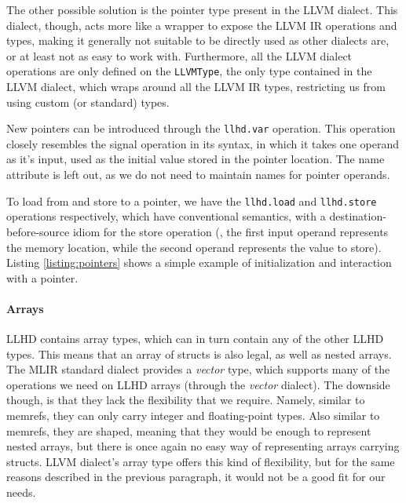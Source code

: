 The other possible solution is the pointer type present in the LLVM dialect. This dialect, though, acts more like a wrapper to expose the LLVM IR operations and types, making it generally not suitable to be directly used as other dialects are, or at least not as easy to work with. Furthermore, all the LLVM dialect operations are only defined on the \texttt{LLVMType}, the only type contained in the LLVM dialect, which wraps around all the LLVM IR types, restricting us from using custom (or standard) types.

New pointers can be introduced through the \texttt{llhd.var} operation. This operation closely resembles the signal operation in its syntax, in which it takes one operand as it's input, used as the initial value stored in the pointer location. The name attribute is left out, as we do not need to maintain names for pointer operands.

To load from and store to a pointer, we have the \texttt{llhd.load} and \texttt{llhd.store} operations respectively, which have conventional semantics, with a destination-before-source idiom for the store operation (\ie, the first input operand represents the memory location, while the second operand represents the value to store). Listing \ref{listing:pointers} shows a simple example of initialization and interaction with a pointer.



\paragraph{Arrays}
LLHD contains array types, which can in turn contain any of the other LLHD types. This means that an array of structs is also legal, as well as nested arrays. The MLIR standard dialect provides a \textit{vector} type, which supports many of the operations we need on LLHD arrays (through the \textit{vector} dialect). The downside though, is that they lack the flexibility that we require. Namely, similar to memrefs, they can only carry integer and floating-point types. Also similar to memrefs, they are shaped, meaning that they would be enough to represent nested arrays, but there is once again no easy way of representing arrays carrying structs. LLVM dialect's array type offers this kind of flexibility, but for the same reasons described in the previous paragraph, it would not be a good fit for our needs.

